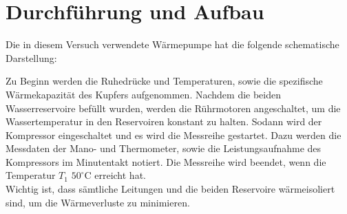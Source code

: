 \section{Durchführung und Aufbau}
\label{sec:Durchführung}

Die in diesem Versuch verwendete Wärmepumpe hat die folgende schematische Darstellung:


Zu Beginn werden die Ruhedrücke und Temperaturen, sowie die spezifische Wärmekapazität des Kupfers aufgenommen. Nachdem die beiden Wasserreservoire befüllt wurden, werden die Rührmotoren angeschaltet, um die Wassertemperatur in den Reservoiren konstant zu halten. Sodann wird der Kompressor eingeschaltet und es wird  die Messreihe gestartet. Dazu werden die Messdaten der Mano- und Thermometer, sowie die Leistungsaufnahme des Kompressors im Minutentakt notiert. Die Messreihe wird beendet, wenn die Temperatur $T_\text{1}$ $50^\circ \text{C}$ erreicht hat. \\
Wichtig ist, dass sämtliche Leitungen und die beiden Reservoire wärmeisoliert sind, um die Wärmeverluste zu minimieren.
